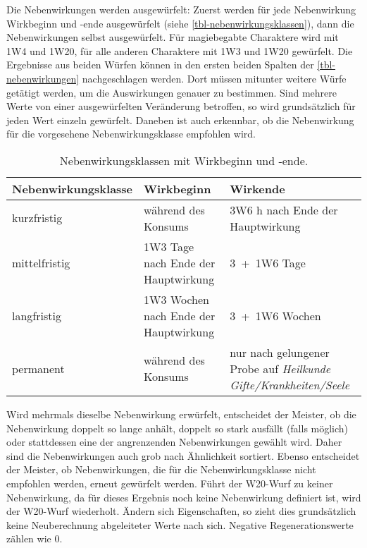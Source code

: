 Die Nebenwirkungen werden ausgewürfelt: Zuerst werden für jede Nebenwirkung Wirkbeginn und -ende ausgewürfelt (siehe \vref{tbl-nebenwirkungsklassen}), dann die Nebenwirkungen selbst ausgewürfelt. Für magiebegabte Charaktere wird mit 1W4 und 1W20, für alle anderen Charaktere mit 1W3 und 1W20 gewürfelt. Die Ergebnisse aus beiden Würfen können in den ersten beiden Spalten der \vref{tbl-nebenwirkungen} nachgeschlagen werden. Dort müssen mitunter weitere Würfe getätigt werden, um die Auswirkungen genauer zu bestimmen. Sind mehrere Werte von einer ausgewürfelten Veränderung betroffen, so wird grundsätzlich für jeden Wert einzeln gewürfelt. Daneben ist auch erkennbar, ob die Nebenwirkung für die vorgesehene Nebenwirkungsklasse empfohlen wird.

{
\begin{table}
	\centering
	\caption[Nebenwirkungsklassen]{Nebenwirkungsklassen mit Wirkbeginn und -ende.\label{tbl-nebenwirkungsklassen}}
	\begin{tabularx}{\textwidth}{p{3.25cm}p{6.75cm}p{5.7cm}}
		\toprule
		Nebenwirkungsklasse & Wirkbeginn & Wirkende \\
		\hline
		kurzfristig & während des Konsums & 3W6 h nach Ende der Hauptwirkung \\
		mittelfristig & 1W3 Tage nach Ende der Hauptwirkung & 3~+~1W6 Tage \\
		langfristig & 1W3 Wochen nach Ende der Hauptwirkung & 3~+~1W6 Wochen \\
		permanent & während des Konsums & nur nach gelungener Probe auf \emph{Heilkunde Gifte/Krankheiten/Seele} \\
		\bottomrule
	\end{tabularx}
\end{table}
}

Wird mehrmals dieselbe Nebenwirkung erwürfelt, entscheidet der Meister, ob die Nebenwirkung doppelt so lange anhält, doppelt so stark ausfällt (falls möglich) oder stattdessen eine der angrenzenden Nebenwirkungen gewählt wird. Daher sind die Nebenwirkungen auch grob nach Ähnlichkeit sortiert. Ebenso entscheidet der Meister, ob Nebenwirkungen, die für die Nebenwirkungsklasse nicht empfohlen werden, erneut gewürfelt werden. Führt der W20-Wurf zu keiner Nebenwirkung, da für dieses Ergebnis noch keine Nebenwirkung definiert ist, wird der W20-Wurf wiederholt. Ändern sich Eigenschaften, so zieht dies grundsätzlich keine Neuberechnung abgeleiteter Werte nach sich. Negative Regenerationswerte zählen wie 0.


